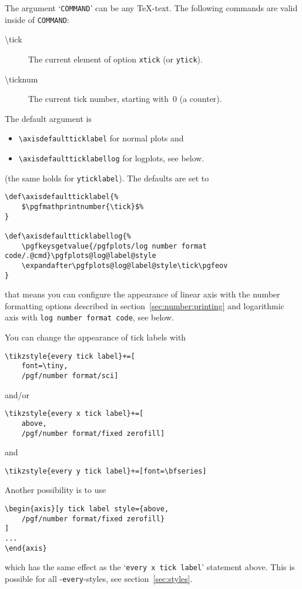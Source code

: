 The argument `\texttt{COMMAND}' can be any \TeX-text. The following commands are valid inside of \texttt{COMMAND}:
\begin{description}
	\item[\textbackslash tick] The current element of option \lstinline!xtick! (or \lstinline!ytick!).
	\item[\textbackslash ticknum] The current tick number, starting with~0 (a counter).
\end{description}
The default argument is 
\begin{itemize}
	\item \lstinline!\axisdefaultticklabel! for normal plots and 
	\item \lstinline!\axisdefaultticklabellog! for logplots, see below.
\end{itemize}
(the same holds for \lstinline!yticklabel!). The defaults are set to
\begin{lstlisting}
\def\axisdefaultticklabel{%
	$\pgfmathprintnumber{\tick}$%
}

\def\axisdefaultticklabellog{%
	\pgfkeysgetvalue{/pgfplots/log number format code/.@cmd}\pgfplots@log@label@style
	\expandafter\pgfplots@log@label@style\tick\pgfeov
}
\end{lstlisting}
that means you can configure the appearance of linear axis with the number formatting options described in section~\ref{sec:number:printing} and logarithmic axis with \texttt{log number format code}, see below.

You can change the appearance of tick labels with
\begin{lstlisting}
\tikzstyle{every tick label}+=[
	font=\tiny,
	/pgf/number format/sci]
\end{lstlisting}
and/or
\begin{lstlisting}
\tikzstyle{every x tick label}+=[
	above,
	/pgf/number format/fixed zerofill]
\end{lstlisting}
and
\begin{lstlisting}
\tikzstyle{every y tick label}+=[font=\bfseries]
\end{lstlisting}
Another possibility is to use 
\begin{lstlisting}
\begin{axis}[y tick label style={above,
	/pgf/number format/fixed zerofill}
]
...
\end{axis}
\end{lstlisting}
which has the same effect as the `\texttt{every x tick label}' statement above. This is possible for all \PGFPlots-\texttt{every}-styles, see section~\ref{sec:styles}.

